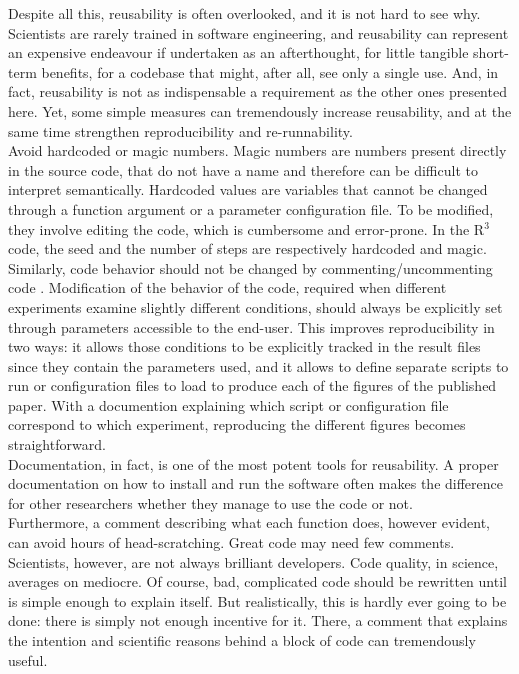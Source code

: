 \documentclass[a4paper,11pt]{article}
\begin{document}
Despite all this, reusability is often overlooked, and it is not hard to see why. Scientists are rarely trained in software engineering, and reusability can represent an expensive endeavour if undertaken as an afterthought, for little tangible short-term benefits, for a codebase that might, after all, see only a single use. And, in fact, reusability is not as indispensable a requirement as the other ones presented here. Yet, some simple measures can tremendously increase reusability, and at the same time strengthen reproducibility and re-runnability.\\

Avoid hardcoded or magic numbers. Magic numbers are numbers present directly in the source code, that do not have a name and therefore can be difficult to interpret semantically. Hardcoded values are variables that cannot be changed through a function argument or a parameter configuration file. To be modified, they involve editing the code, which is cumbersome and error-prone. In the R$^3$ code, the seed and the number of steps are respectively hardcoded and magic.\\

Similarly, code behavior should not be changed by commenting/uncommenting code \citep{Wilson:2017}. Modification of the behavior of the code, required when different experiments examine slightly different conditions, should always be explicitly set through parameters accessible to the end-user. This improves reproducibility in two ways: it allows those conditions to be explicitly tracked in the result files since they contain the parameters used, and it allows to define separate scripts to run or configuration files to load to produce each of the figures of the published paper. With a documention explaining which script or configuration file correspond to which experiment, reproducing the different figures becomes straightforward.\\

Documentation, in fact, is one of the most potent tools for reusability. A proper documentation on how to install and run the software often makes the difference for other researchers whether they manage to use the code or not.\\

Furthermore, a comment describing what each function does, however evident, can avoid hours of head-scratching. Great code may need few comments. Scientists, however, are not always brilliant developers. Code quality, in science, averages on mediocre. Of course, bad, complicated code should be rewritten until is simple enough to explain itself. But realistically, this is hardly ever going to be done: there is simply not enough incentive for it. There, a comment that explains the intention and scientific reasons behind a block of code can tremendously useful.\\
\end{document}
